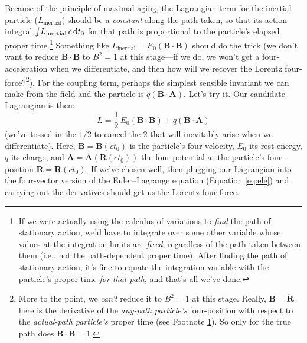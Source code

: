 \documentclass[12pt]{article}
\renewcommand{\vv}[1]{\mathbf{#1}}
\newcommand{\dd}[1]{\mathrm{d}#1}
\begin{document}
Because of the principle of maximal aging, the Lagrangian term for the inertial particle ($L_{\textrm{inertial}}$) should be a \emph{constant} along the path taken, so that its action integral $\int \mkern-4mu L_{\textrm{inertial}} \, c \, \dd t_0$ for that path is proportional to the particle's elapsed proper time.\footnote{\label{fn:covpt}If we were actually using the calculus of variations to \emph{find} the path of stationary action, we'd have to integrate over some other variable whose values at the integration limits are \emph{fixed}, regardless of the path taken between them (i.e., not the path-dependent proper time). After finding the path of stationary action, it's fine to equate the integration variable with the particle's proper time \emph{for that path}, and that's all we've done.} Something like $L_{\textrm{inertial}} = E_0 (\vv B \cdot \vv B)$ should do the trick (we don't want to reduce $\vv B \cdot \vv B$ to $B^2 = 1$ at this stage---if we do, we won't get a four-acceleration when we differentiate, and then how will we recover the Lorentz four-force?\footnote{More to the point, we \emph{can't} reduce it to $B^2 = 1$ at this stage. Really, $\vv B = \mathring{\vv R}$ here is the derivative of the \emph{any-path particle's} four-position with respect to the \emph{actual-path particle's} proper time (see Footnote \ref{fn:covpt}). So only for the true path does $\vv B \cdot \vv B = 1$.}). For the coupling term, perhaps the simplest sensible invariant we can make from the field and the particle is $q (\vv B \cdot \vv A)$. Let's try it. Our candidate Lagrangian is then:
\begin{equation*}
L = \dfrac{1}{2} \, E_0 (\vv B \cdot \vv B) + q (\vv B \cdot \vv A)
\end{equation*}
(we've tossed in the $1/2$ to cancel the $2$ that will inevitably arise when we differentiate). Here, $\vv B = \vv B (ct_0)$ is the particle's four-velocity, $E_0$ its rest energy, $q$ its charge, and $\vv A = \vv A (\vv R (ct_0))$ the four-potential at the particle's four-position $\vv R = \vv R (ct_0)$. If we've chosen well, then plugging our Lagrangian into the four-vector version of the Euler--Lagrange equation (Equation \ref{eq:ele}) and carrying out the derivatives should get us the Lorentz four-force.
\end{document}
